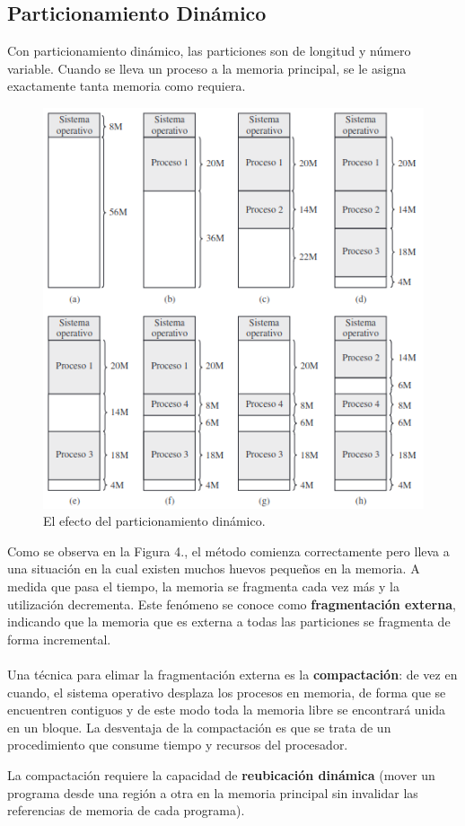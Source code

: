 \documentclass[12pt, a4paper]{article}
\begin{document}
\subsection{Particionamiento Dinámico}
Con particionamiento dinámico, las particiones son de longitud y número variable. Cuando se lleva un proceso a la memoria principal, se le asigna exactamente tanta memoria como requiera.
\begin{figure}[H]
    \centering
    \includegraphics[width=12cm]{particiondinamica.png}\par
    \caption{El efecto del particionamiento dinámico.}
\end{figure}
Como se observa en la Figura 4., el método comienza correctamente pero lleva a una situación en la cual existen muchos huevos pequeños en la memoria. A medida que pasa el tiempo, la memoria se fragmenta cada vez más y la utilización decrementa. Este fenómeno se conoce como \textbf{fragmentación externa}, indicando que la memoria que es externa a todas las particiones se fragmenta de forma incremental.\\\\ 
Una técnica para elimar la fragmentación externa es la \textbf{compactación}: de vez en cuando, el sistema operativo desplaza los procesos en memoria, de forma que se encuentren contiguos y de este modo toda la memoria libre se encontrará unida en un bloque. La desventaja de la compactación es que se trata de un procedimiento que consume tiempo y recursos del procesador.
\begin{tcolorbox}[colback=cyan!10, colframe=blue!70, title=Nota]
    La compactación requiere la capacidad de \textbf{reubicación dinámica} (mover un programa desde una región a otra en la memoria principal sin invalidar las referencias de memoria de cada programa).
\end{tcolorbox}
\end{document}
